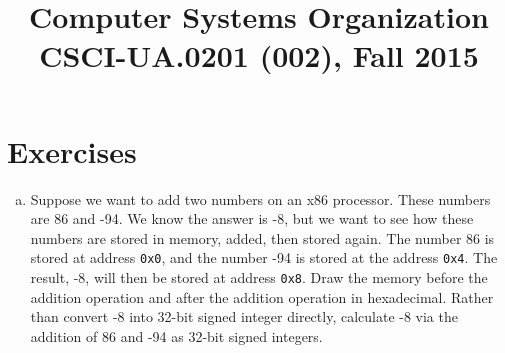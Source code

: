 \documentclass{article}
\title{Computer Systems Organization\\CSCI-UA.0201 (002), Fall 2015}
\author{}
\date{}
\newcommand{\code}[1]{{\tt{}#1}}
\begin{document}
\maketitle

\section{Exercises}
\begin{enumerate}[(a)]
\item Suppose we want to add two numbers on an x86 processor. These numbers are 86 and -94. We know the answer is -8, but we want to see how these numbers are stored in memory, added, then stored again. The number 86 is stored at address \code{0x0}, and the number -94 is stored at the address \code{0x4}. The result, -8, will then be stored at address \code{0x8}. Draw the memory before the addition operation and after the addition operation in hexadecimal. Rather than convert -8 into 32-bit signed integer directly, calculate -8 via the addition of 86 and -94 as 32-bit signed integers.
\end{enumerate}

\newpage
\end{document}
